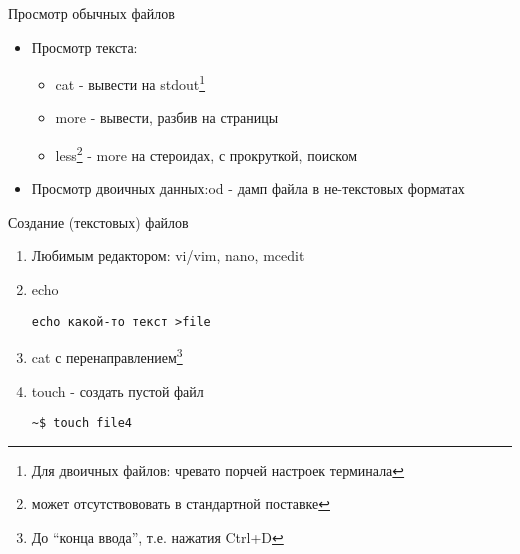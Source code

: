 \begin{frame}{Просмотр обычных файлов}
  \begin{itemize}
    \item Просмотр текста:
      \begin{itemize} 
	\item \alert{cat} - вывести на stdout\footnote{Для двоичных файлов: чревато порчей настроек терминала} \pause
	\item \alert{more} - вывести, разбив на страницы
	\item \alert{less}\footnote{может отсутствововать в стандартной поставке} - \alert{more} на стероидах, с прокруткой, поиском 
      \end{itemize} \pause
    \item Просмотр двоичных данных:\newline \alert{od} - дамп файла в не-текстовых форматах
  \end{itemize}


\end{frame}

\begin{frame}[fragile]{Создание (текстовых) файлов}
  \pause
  \begin{enumerate}
    \item Любимым редактором: \alert{vi/vim}, \alert{nano}, \alert{mcedit} \pause
    \item \alert{echo}
\begin{lstlisting}[frame=single]
echo какой-то текст >file
\end{lstlisting}\pause
    \item \alert{cat} с перенаправлением\footnote{До ``конца ввода'', т.е. нажатия Ctrl+D}
 \pause
    \item \alert{touch} - создать пустой файл
\begin{lstlisting}[frame=single]
~$ touch file4
\end{lstlisting}
  \end{enumerate}
\end{frame}


